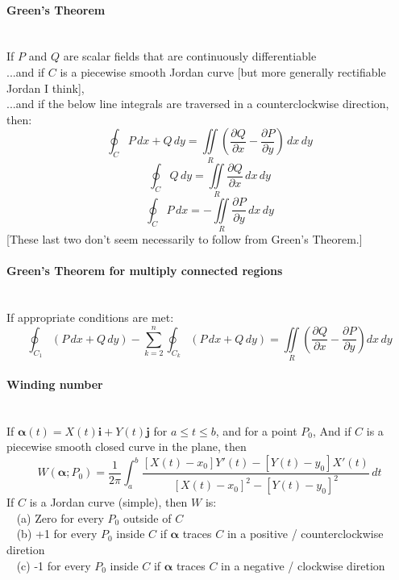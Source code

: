 \documentclass[10pt]{article}
\newcommand{\bs}[1]{\pmb{#1}}
\begin{document}
\paragraph{Green's Theorem}\ \\
If $P$ and $Q$ are scalar fields that are continuously differentiable\\
...and if $C$ is a piecewise smooth Jordan curve [but more generally rectifiable Jordan I think],\\
...and if the below line integrals are traversed in a counterclockwise direction, then:
\begin{equation*}
\oint_C P\,dx+Q\,dy
= \iint\limits_R \left(\frac{\partial Q}{\partial x}-\frac{\partial P}{\partial y}\right)\,dx\,dy 
\end{equation*}
\begin{equation*}
\oint_C Q\,dy = \iint\limits_R \frac{\partial Q}{\partial x}\,dx\,dy
\end{equation*}
\begin{equation*}
\oint_C P\,dx = - \iint\limits_R \frac{\partial P}{\partial y}\,dx\,dy
\end{equation*}
[These last two don't seem necessarily to follow from Green's Theorem.]

\paragraph{Green's Theorem for multiply connected regions}\ \\
If appropriate conditions are met:
\begin{equation*}
\oint_{C_1}(P\,dx+Q\,dy)-\sum_{k=2}^n\oint_{C_k}(P\,dx+Q\,dy)
= \iint\limits_R\left(\frac{\partial Q}{\partial x}-\frac{\partial P}{\partial y}\right)dx\,dy
\end{equation*}

\paragraph{Winding number}\ \\
If $\bs{\alpha}(t) = X(t)\bs{i} + Y(t)\bs{j}$ for $a \leq t \leq b$, and for a point $P_0$,
And if $C$ is a piecewise smooth closed curve in the plane, then
\begin{equation*}
W(\bs{\alpha};P_0)=\frac{1}{2\pi}\int_a^b\frac{[X(t)-x_0]Y'(t)-[Y(t)-y_0]X'(t)}{[X(t)-x_0]^2-[Y(t)-y_0]^2}\,dt
\end{equation*}
If $C$ is a Jordan curve (simple), then $W$ is:\\
$\phantom{x}$ (a) Zero for every $P_0$ outside of $C$\\
$\phantom{x}$ (b) +1 for every $P_0$ inside $C$ if $\bs{\alpha}$ traces $C$ in a positive / counterclockwise diretion\\
$\phantom{x}$ (c) -1 for every $P_0$ inside $C$ if $\bs{\alpha}$ traces $C$ in a negative / clockwise diretion
\end{document}

